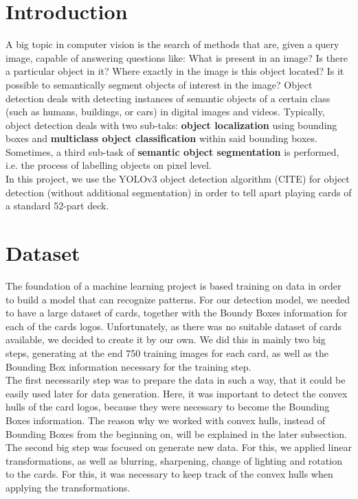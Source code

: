 \documentclass[a4paper]{article}
\begin{document}
\section{Introduction}
A big topic in computer vision is the search of methods that are, given a query image, capable of answering questions like: What is present in an image? Is there a particular object in it? Where exactly in the image is this object located? Is it possible to semantically segment objects of interest in the image?
Object detection deals with detecting instances of semantic objects of a certain class (such as humans, buildings, or cars) in digital images and videos. Typically, object detection deals with two sub-taks: \textbf{object localization} using bounding boxes and \textbf{multiclass object classification} within said bounding boxes.
Sometimes, a third sub-task of \textbf{semantic object segmentation} is performed, i.e. the process of labelling objects on pixel level.\\
In this project, we use the YOLOv3 object detection algorithm (CITE) for object detection (without additional segmentation) in order to tell apart playing cards of a standard 52-part deck.

\section{Dataset}
The foundation of a machine learning project is based training on data in order to build a model that can recognize patterns.   For our detection model, we needed to have a large dataset of cards, together with the Boundy Boxes information for each of the cards logos.  Unfortunately, as there was no suitable dataset of cards available, we decided to create it by our own.  We did this in mainly two big steps, generating at the end 750 training images for each card, as well as the Bounding Box information necessary for the training step.   \\
The first necessarily step was to prepare the data in such a way, that it could be easily used later for data generation.  Here, it was important to detect the convex hulls of the card logos, because they were necessary to become the Bounding Boxes information.  The reason why we worked with convex hulls, instead of Bounding Boxes from the beginning on, will be explained in the later subsection.
The second big step was focused on generate new data.  For this, we applied linear transformations, as well as blurring, sharpening, change of lighting and rotation to the cards. 
For this, it was necessary to keep track of the convex hulls when applying the transformations. 
\end{document}
